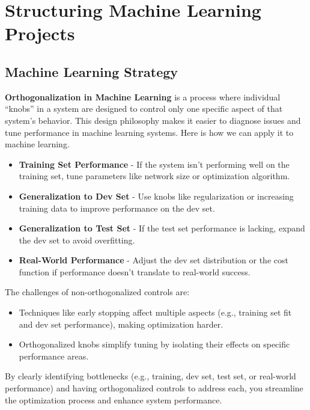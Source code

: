 \documentclass[letterpaper,12pt,notitlepage,twoside]{report}
\begin{document}
\chapter{Structuring Machine Learning Projects} \label{ch:3}
\section{Machine Learning Strategy}
\textbf{Orthogonalization in Machine Learning} is a process where individual ``knobs'' in a system are designed to control only one specific aspect of that system's behavior. This design philosophy makes it easier to diagnose issues and tune performance in machine learning systems. Here is how we can apply it to machine learning.
\begin{itemize}[noitemsep, topsep=0pt]
\item \textbf{Training Set Performance} - If the system isn’t performing well on the training set, tune parameters like network size or optimization algorithm.
\item \textbf{Generalization to Dev Set} - Use knobs like regularization or increasing training data to improve performance on the dev set.
\item \textbf{Generalization to Test Set} - If the test set performance is lacking, expand the dev set to avoid overfitting.
\item \textbf{Real-World Performance} - Adjust the dev set distribution or the cost function if performance doesn’t translate to real-world success.
\end{itemize}

The challenges of non-orthogonalized controls are:
\begin{itemize}[noitemsep, topsep=0pt]
\item Techniques like early stopping affect multiple aspects (e.g., training set fit and dev set performance), making optimization harder.
\item Orthogonalized knobs simplify tuning by isolating their effects on specific performance areas.
\end{itemize}

By clearly identifying bottlenecks (e.g., training, dev set, test set, or real-world performance) and having orthogonalized controls to address each, you streamline the optimization process and enhance system performance.
\end{document}
